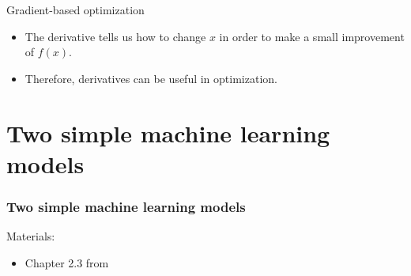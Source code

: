 \documentclass[notes]{beamer}          %
\newcommand{\vect}[1]{\bm{#1}}
\newif\iffull
\begin{document}
\begin{frame}{Gradient-based optimization}

\begin{itemize}
    \item The derivative tells us how to change $x$ in order to make a small improvement of $f(x)$.
    \item Therefore, derivatives can be useful in optimization.


\end{itemize}
\end{frame}


\section{Two simple machine learning models}


\begin{frame}
\frametitle{Two simple machine learning models}
Materials:
\begin{itemize}
    \item Chapter 2.3 from \cite{elements}
\end{itemize}

\end{frame}

\iffull
\begin{frame}
\frametitle{Some notations}
    \begin{itemize}
        \item We denote an input variable with the symbol $x$ (scalar) or $\vect{x}$ (vector).
        \item The $i$-th component of a vector input $\vect{x}$ is denoted as $x_i$.
        \item Quantitative (numerical) outputs are denoted with $y$.
        \item Qualitative outputs are denoted with $g$ (from group) and take values from a set $\cal{G}$.
        \item Matrices are denoted with bold and uppercase letters $\vect{X}$\\
        for instance, a set of $N$ input $p$-vectors $\vect{x}_i$ ($1 \leq i \leq N)$ is "packed" in a $N \times p$ input matrix $\vect{X}$.
        \item Since by default vectors are assumed to be column vectors, the rows of $\vect{X}$ are the transposes $\vect{x}_i^T$.
    \end{itemize}
\end{frame}
\fi
\end{document}

